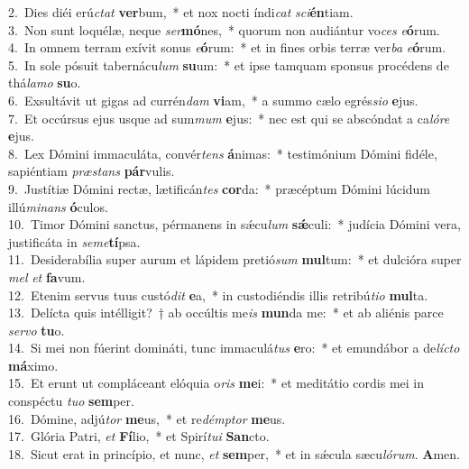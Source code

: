 {2.~}Dies diéi erú\textit{ctat} \textbf{ver}bum,~* et nox nocti índi\textit{cat} \textit{sci}\textbf{én}tiam.\\
{3.~}Non sunt loquélæ, neque \textit{ser}\textbf{mó}nes,~* quorum non audiántur vo\textit{ces} \textit{e}\textbf{ó}rum.\\
{4.~}In omnem terram exívit sonus \textit{e}\textbf{ó}rum:~* et in fines orbis terræ ver\textit{ba} \textit{e}\textbf{ó}rum.\\
{5.~}In sole pósuit tabernácu\textit{lum} \textbf{su}um:~* et ipse tamquam sponsus procédens de thá\textit{la}\textit{mo} \textbf{su}o.\\
{6.~}Exsultávit ut gigas ad currén\textit{dam} \textbf{vi}am,~* a summo cælo egrés\textit{si}\textit{o} \textbf{e}jus.\\
{7.~}Et occúrsus ejus usque ad sum\textit{mum} \textbf{e}jus:~* nec est qui se abscóndat a ca\textit{ló}\textit{re} \textbf{e}jus.\\
{8.~}Lex Dómini immaculáta, convér\textit{tens} \textbf{á}nimas:~* testimónium Dómini fidéle, sapiéntiam \textit{præ}\textit{stans} \textbf{pár}vulis.\\
{9.~}Justítiæ Dómini rectæ, lætificán\textit{tes} \textbf{cor}da:~* præcéptum Dómini lúcidum illú\textit{mi}\textit{nans} \textbf{ó}culos.\\
{10.~}Timor Dómini sanctus, pérmanens in sǽcu\textit{lum} \textbf{sǽ}culi:~* judícia Dómini vera, justificáta in \textit{se}\textit{me}\textbf{tí}psa.\\
{11.~}Desiderabília super aurum et lápidem pretió\textit{sum} \textbf{mul}tum:~* et dulcióra super \textit{mel} \textit{et} \textbf{fa}vum.\\
{12.~}Etenim servus tuus custó\textit{dit} \textbf{e}a,~* in custodiéndis illis retribú\textit{ti}\textit{o} \textbf{mul}ta.\\
{13.~}Delícta quis intélligit?~† ab occúltis me\textit{is} \textbf{mun}da me:~* et ab aliénis parce \textit{ser}\textit{vo} \textbf{tu}o.\\
{14.~}Si mei non fúerint domináti, tunc immaculá\textit{tus} \textbf{e}ro:~* et emundábor a de\textit{lí}\textit{cto} \textbf{má}ximo.\\
{15.~}Et erunt ut compláceant elóquia o\textit{ris} \textbf{me}i:~* et meditátio cordis mei in conspéctu \textit{tu}\textit{o} \textbf{sem}per.\\
{16.~}Dómine, adjú\textit{tor} \textbf{me}us,~* et re\textit{dém}\textit{ptor} \textbf{me}us.\\
{17.~}Glória Patri, \textit{et} \textbf{Fí}lio,~* et Spirí\textit{tu}\textit{i} \textbf{San}cto.\\
{18.~}Sicut erat in princípio, et nunc, \textit{et} \textbf{sem}per,~* et in sǽcula sæcu\textit{ló}\textit{rum}. \textbf{A}men.\\
